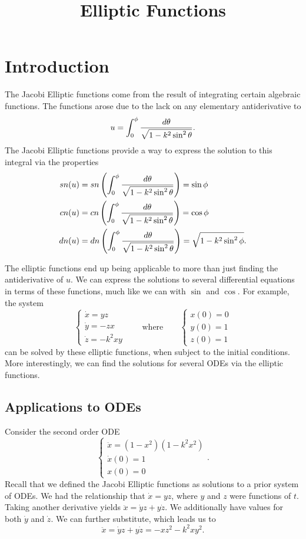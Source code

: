 \documentclass[notitlepage]{hw}
\title{Elliptic Functions}
\date{}
\author{}
\begin{document}
\maketitle

\section{Introduction}

The Jacobi Elliptic functions come from the result of integrating certain algebraic functions. The
functions arose due to the lack on any elementary antiderivative to
\[
u=\int_{0}^{\phi}{d\theta\over\sqrt{1-k^{2}\sin^{2}{\theta}}}.
\]
The Jacobi Elliptic functions provide a way to express the solution to this integral via the properties
\begin{align*}
sn(u)&=sn\left(\int_{0}^{\phi}{d\theta\over\sqrt{1-k^{2}\sin^{2}{\theta}}}\right)=\sin{\phi}\\
cn(u)&=cn\left(\int_{0}^{\phi}{d\theta\over\sqrt{1-k^{2}\sin^{2}{\theta}}}\right)=\cos{\phi}\\
dn(u)&=dn\left(\int_{0}^{\phi}{d\theta\over\sqrt{1-k^{2}\sin^{2}{\theta}}}\right)=
\sqrt{1-k^{2}\sin^{2}{\phi}}.
\end{align*}

The elliptic functions end up being applicable to more than just finding the antiderivative of $u$.
We can express the solutions to several differential equations in terms of these functions, much like
we can with $\sin{}$ and $\cos{}$. For example, the system
\[
\begin{cases}
\dot{x} = yz\\
\dot{y} = -zx\\
\dot{z} = -k^{2}xy
\end{cases}
\qquad
\text{where}
\qquad
\begin{cases}
x(0)=0\\
y(0)=1\\
z(0)=1
\end{cases}
\]
can be solved by these elliptic functions, when subject to the initial conditions. More interestingly,
we can find the solutions for several ODEs via the elliptic functions.

\subsection{Applications to ODEs}
Consider the second order ODE
\[
\begin{cases}
\ddot{x} = (1-x^{2})(1-k^{2}x^{2})\\
\dot{x}(0)=1\\
x(0)=0
\end{cases}.
\]
Recall that we defined the Jacobi Elliptic functions as solutions to a prior system of ODEs. We had
the relationship that $\dot{x}=yz$, where $y$ and $z$ were functions of $t$. Taking another derivative
yields $\ddot{x}=\dot{y}z+y\dot{z}$. We additionally have values for both $\dot{y}$ and $\dot{z}$.
We can further substitute, which leads us to
\[
\ddot{x}=\dot{y}z+y\dot{z}= -xz^{2}-k^{2}xy^{2}.
\]
\end{document}

